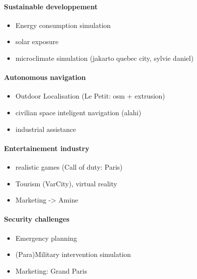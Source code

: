         \paragraph{Sustainable developpement}
        \begin{itemize}
            \item Energy consumption simulation
            \item solar exposure
            \item microclimate simulation (jakarto quebec city, sylvie daniel)
        \end{itemize}
        \paragraph{Autonomous navigation}
        \begin{itemize}
            \item Outdoor Localisation (Le Petit: osm + extrusion)
            \item civilian space inteligent navigation (alahi)
            \item industrial assistance
        \end{itemize}
        \paragraph{Entertainement industry}
        \begin{itemize}
            \item realistic games (Call of duty: Paris)
            \item Tourism (VarCity), virtual reality
            \item Marketing -> Amine
        \end{itemize}
        \paragraph{Security challenges}
        \begin{itemize}
            \item Emergency planning
            \item (Para)Military intervention simulation
            \item Marketing: Grand Paris
        \end{itemize}
